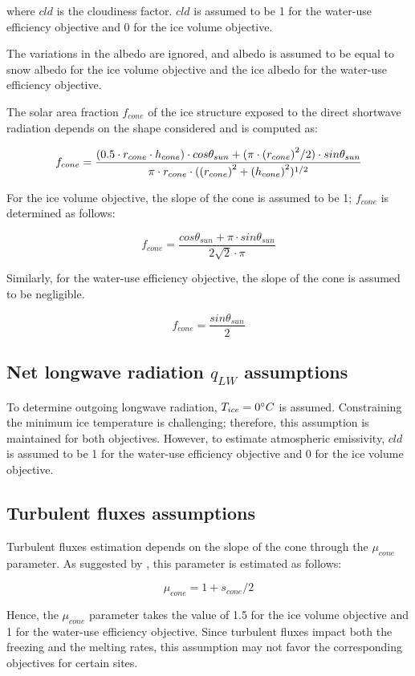 where $cld$ is the cloudiness factor. $cld$ is assumed to be 1 for the water-use efficiency objective and 0 for the ice volume
objective.

The variations in the albedo are ignored, and albedo is assumed to be equal to snow albedo for the
ice volume objective and the ice albedo for the water-use efficiency objective.

The solar area fraction $f_{cone}$ of the ice structure exposed to the direct shortwave radiation depends on the
shape considered and is computed as:

\begin{equation}
		f_{cone} =\frac{(0.5 \cdot r_{cone} \cdot h_{cone}) \cdot cos \theta_{sun} +(\pi \cdot
			{(r_{cone})}^2/2) \cdot sin \theta_{sun} }{\pi \cdot r_{cone} \cdot ({(r_{cone})}^2+{(h_{cone})}^2)^{1/2}}\\
\end{equation}

For the ice volume objective, the slope of the cone is assumed to be 1; $f_{cone}$ is determined as follows:

\begin{equation}
		f_{cone} =\frac{ cos \theta_{sun} + \pi \cdot sin \theta_{sun} }{2\sqrt{2} \cdot \pi }
\end{equation}

Similarly, for the water-use efficiency objective, the slope of the cone is assumed to be negligible.

\begin{equation}
		f_{cone} =\frac{ sin \theta_{sun} }{2 }
\end{equation}

\subsection{Net longwave radiation \texorpdfstring{$q_{LW}$}{Lg} assumptions} 

To determine outgoing longwave radiation, $T_{ice} = 0 ^{\circ} C$ is assumed. Constraining the minimum ice
temperature is challenging; therefore, this assumption is maintained for both objectives. However, to
estimate atmospheric emissivity, $cld$ is assumed to be 1 for the water-use efficiency objective and 0 for the ice volume
objective.

\subsection{Turbulent fluxes assumptions} 

Turbulent fluxes estimation depends on the slope of the cone through the $\mu_{cone}$ parameter. As suggested 
by \citet{oerlemansBriefCommunicationGrowth2021}, this parameter is estimated as follows:

\begin{equation}
  \mu_{cone} =1 + s_{cone}/2
\end{equation}

Hence, the $\mu_{cone}$ parameter takes the value of 1.5 for the ice volume objective and 1 for the water-use efficiency
objective. Since turbulent fluxes impact both the freezing and the melting rates, this assumption
may not favor the corresponding objectives for certain sites.
